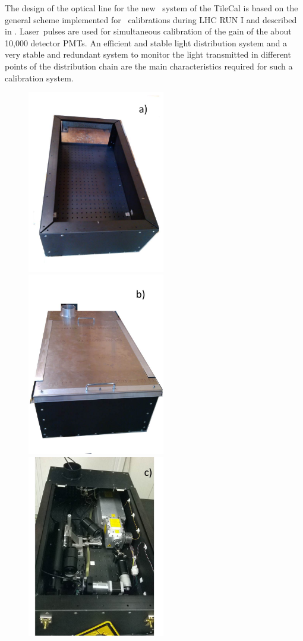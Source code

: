 The design of the optical line for the new \lasii~system of the TileCal is based on the general scheme implemented for \laser~calibrations
during LHC RUN I and described in \cite{ref:lasercalvet}. Laser~pulses are used for
simultaneous calibration of the gain of the about 10,000 detector PMTs.
An efficient and stable light distribution system and a very stable and redundant
system to monitor the light transmitted in different points of the distribution
chain are the main characteristics required for such a calibration system.

% 
\begin{figure}[htbp]
\begin{center} 
\includegraphics[width=5.cm, height=8cm]{figures/Optics_box_1}
\includegraphics[width=5.cm, height=8cm]{figures/Optics_box_2}
\includegraphics[width=5.cm, height=8cm]{figures/Optics_box_3}

\end{center}
\end{figure}
